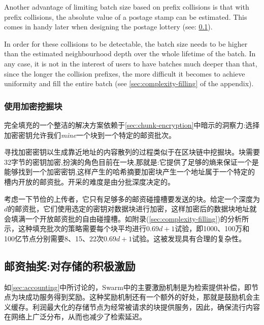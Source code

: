 Another advantage of limiting batch size based on prefix collisions is that with prefix collisions, the absolute value of a postage stamp can be estimated. This comes in handy later when designing the postage lottery (see: \ref{sec:postage-lottery}). 


In order for these collisions to be detectable, the batch size needs to be higher than the estimated neighbourhood depth over the whole lifetime of the batch. In any case, it is not in the interest of users to have batches much deeper than that, since the longer the collision prefixes, the more difficult it becomes to achieve uniformity and fill the entire batch  (see \ref{sec:complexity-filling} of the appendix). 


\subsubsection{使用加密挖掘块}

完全填充的一个整洁的解决方案依赖于\ref{sec:chunk-encryption}中暗示的洞察力:选择加密密钥允许我们\emph{mine}一个块到一个特定的邮资批次。

寻找加密密钥以生成靠近地址的内容散列的过程类似于在区块链中挖掘块。块需要32字节的密钥加密,扮演的角色目前在一块,那就是:它提供了足够的熵来保证一个是能够找到一个加密密钥,这样产生的哈希摘要加密块产生一个地址属于一个特定的槽内开放的邮资批。开采的难度是由分批深度决定的。

考虑一下节俭的上传者，它只有足够多的邮资碰撞槽要发送的块。给定一个深度为$d$的邮资批，它们使用选定的密钥对数据块进行加密，这样加密后的数据块地址就会填满一个开放邮资批的自由碰撞槽。如附录(\ref{sec:complexity-filling})的分析所示，这种填充批次的策略需要每个块平均进行$0.69d+1$试验，即1000、100万和100亿节点分别需要8、15、22次$0.69d+1$试验。这被发现具有合理的复杂性。


\subsection{邮资抽奖:对存储的积极激励\statusyellow}\label{sec:postage-lottery}

\yellow{}

如\ref{sec:accounting}中所讨论的，Swarm中的主要激励机制是为检索提供补偿，即节点为块成功服务得到奖励。这种奖励机制还有一个额外的好处，那就是鼓励机会主义缓存。利润最大化的存储节点为经常被请求的块提供服务，因此，确保流行内容在网络上广泛分布，从而也减少了检索延迟。


